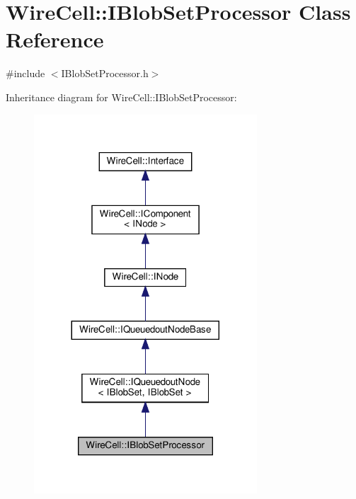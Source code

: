 \hypertarget{class_wire_cell_1_1_i_blob_set_processor}{}\section{Wire\+Cell\+:\+:I\+Blob\+Set\+Processor Class Reference}
\label{class_wire_cell_1_1_i_blob_set_processor}


{\ttfamily \#include $<$I\+Blob\+Set\+Processor.\+h$>$}



Inheritance diagram for Wire\+Cell\+:\+:I\+Blob\+Set\+Processor\+:
\nopagebreak
\begin{figure}[H]
\begin{center}
\leavevmode
\includegraphics[width=236pt]{class_wire_cell_1_1_i_blob_set_processor__inherit__graph}
\end{center}
\end{figure}


